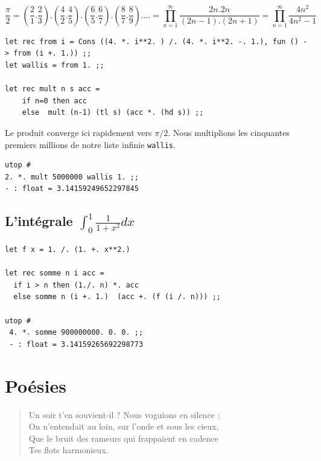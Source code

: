 \[ \frac{\pi}{2} = ( \frac{2}{1}.\frac{2}{3} ) . (\frac{4}{2}.\frac{4}{5} ).(\frac{6}{5}.\frac{6}{7} ).(\frac{8}{7}.\frac{8}{9} ) . ...  =  \prod_{n=1}^\infty \frac{2n.2n}{(2n-1).(2n+1)} = \prod_{n=1}^\infty \frac{4n^2}{4n^2-1}\]
\vspace{0.3cm}	
\begin{verbatim}
let rec from i = Cons ((4. *. i**2. ) /. (4. *. i**2. -. 1.), fun () -> from (i +. 1.)) ;;
let wallis = from 1. ;;

let rec mult n s acc =
	if n=0 then acc
	else  mult (n-1) (tl s) (acc *. (hd s)) ;;
\end{verbatim}
Le produit converge ici rapidement vers $\pi /2$. Nous multiplions les cinquantes premiers millions 
de notre liste infinie \verb+wallis+.
\begin{verbatim}
utop # 
2. *. mult 5000000 wallis 1. ;;
- : float = 3.14159249652297845
\end{verbatim}

\subsection{L'intégrale $\int_0^1 \frac{1}{1+x^2} dx$}
 
\begin{verbatim}
let f x = 1. /. (1. +. x**2.)

let rec somme n i acc =
  if i > n then (1./. n) *. acc 
  else somme n (i +. 1.)  (acc +. (f (i /. n))) ;;

utop # 
 4. *. somme 900000000. 0. 0. ;;
 - : float = 3.14159265692298773
\end{verbatim}

\section{Poésies}
\begin{verse}
	Un soir t'en souvient-il ? Nous voguions en silence ; \\
	On n’entendait au loin, sur l’onde et sous les cieux,  \\
	Que le bruit des rameurs qui frappaient en cadence     \\
	Tes flots harmonieux. \\
\end{verse}

